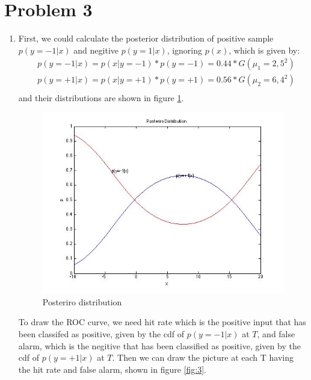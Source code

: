 \documentclass[paper=a4, fontsize=11pt]{scrartcl} %
\numberwithin{equation}{section} %
\numberwithin{figure}{section} %
\numberwithin{table}{section} %
\begin{document}
\section{Problem 3}
\begin{enumerate}
\item First, we could calculate the posterior distribution of positive sample $p(y=-1|x)$ and negitive $p(y=1|x)$, ignoring $p(x)$, which is given by:
\begin{equation}
\begin{split}
& p(y=-1|x) = p(x|y=-1)*p(y=-1) = 0.44*G(\mu_{1} = 2, 5^2) \\
& p(y=+1|x) = p(x|y=+1)*p(y=+1) = 0.56*G(\mu_{2} = 6, 4^2) \\
\end{split}
\end{equation}
and their distributions are shown in figure \ref{fig:5}.
\begin{figure}
\centering
\includegraphics[width = 5in]{figure5.jpg}
\caption{Posteriro distribution}
\label{fig:5}
\end{figure}

To draw the ROC curve, we need hit rate which is the positive input that has been classifed as positive, given by the cdf of $p(y=-1|x)$ at $T$, and false alarm, which is the negitive that has been classified as positive, given by the cdf of $p(y=+1|x)$ at $T$. Then we can draw the picture at each T having the hit rate and false alarm, shown in figure \ref{fig:3}.


\end{enumerate}
\end{document}
